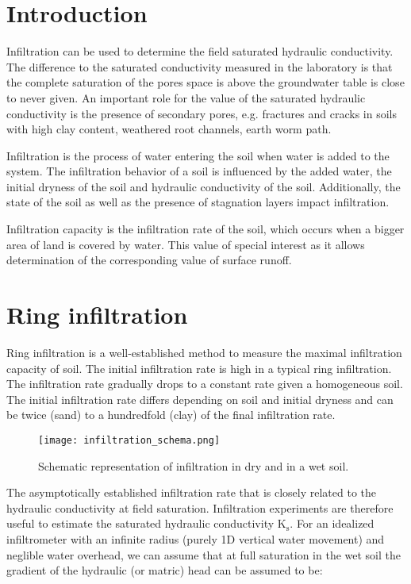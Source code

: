 \documentclass[
10pt, %
a4paper, %
oneside, %
headinclude,footinclude, %
BCOR5mm, %
]{scrartcl}
\begin{document}
\section{Introduction}

Infiltration can be used to determine the field saturated hydraulic conductivity. The difference to the saturated conductivity measured in the laboratory is that the complete saturation of the pores space is above the groundwater table is close to never given. An important role for the value of the saturated hydraulic conductivity is the presence of secondary pores, e.g. fractures and cracks in soils with high clay content, weathered root channels, earth worm path. \medskip

Infiltration is the process of water entering the soil when water is added to the system. The infiltration behavior of a soil is influenced by the added water, the initial dryness of the soil and hydraulic conductivity of the soil. Additionally, the state of the soil as well as the presence of stagnation layers impact infiltration. \medskip

Infiltration capacity is the infiltration rate of the soil, which occurs when a bigger area of land is covered by water. This value of special interest as it allows determination of the corresponding value of surface runoff.\medskip

\section{Ring infiltration}
Ring infiltration is a well-established method to measure the maximal infiltration capacity of soil. The initial infiltration rate is high in a typical ring infiltration. The infiltration rate gradually drops to a constant rate given a homogeneous soil. The initial infiltration rate differs depending on soil and initial dryness and can be twice (sand) to a hundredfold (clay) of the final infiltration rate.

\begin{figure}[!h]
\centering
\texttt{[image: infiltration\_schema.png]}
\caption{\label{schema_inf}Schematic representation of infiltration in dry and in a wet soil.}
\end{figure}

The asymptotically established infiltration rate that is closely related to the hydraulic conductivity at field saturation. Infiltration experiments are therefore useful to estimate the saturated hydraulic conductivity K$_\mathrm{s}$. For an idealized infiltrometer with an infinite radius (purely 1D vertical water movement) and neglible water overhead, we can assume that at full saturation in the wet soil the gradient of the hydraulic (or matric) head can be assumed to be:
\end{document}
